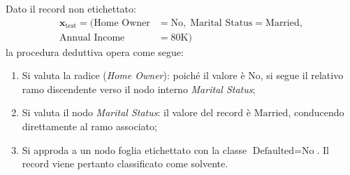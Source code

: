 \begin{table}[H]
\centering
\caption{Dataset storico di addestramento per la previsione dell'insolvenza creditizia.}
\label{tab:dm-borrowers-dataset}
\vspace{2mm}
\end{table}

\begin{example}
Dato il record non etichettato:
\begin{align*}
    \mathbf{x}_{\text{test}} = (\text{Home Owner}&=\text{No}, \; \text{Marital Status}=\text{Married}, \\
    \text{Annual Income}&=80\text{K})
\end{align*}
la procedura deduttiva opera come segue:
\begin{enumerate}
    \item Si valuta la radice (\textit{Home Owner}): poiché il valore è $\text{No}$, si segue il relativo ramo discendente verso il nodo interno \textit{Marital Status};
    \item Si valuta il nodo \textit{Marital Status}: il valore del record è $\text{Married}$, conducendo direttamente al ramo associato;
    \item Si approda a un nodo foglia etichettato con la classe $\text{Defaulted} = \text{No}$. Il record viene pertanto classificato come solvente.
\end{enumerate}
\end{example}

